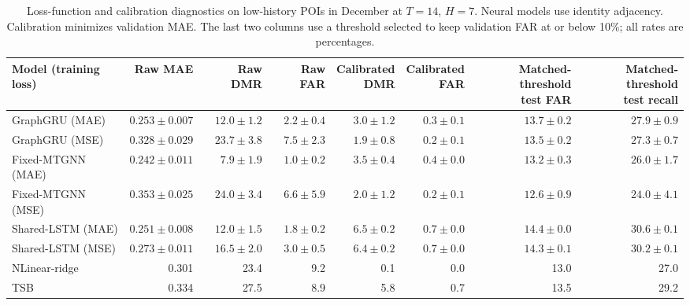 \begin{table}[!htbp]
\centering
\begingroup
\singlespacing
\fontsize{9pt}{10.5pt}\selectfont
\setlength{\tabcolsep}{4pt}
\renewcommand{\arraystretch}{1.08}
\caption{Loss-function and calibration diagnostics on low-history POIs in December at $T=14$, $H=7$. Neural models use identity adjacency. Calibration minimizes validation MAE. The last two columns use a threshold selected to keep validation FAR at or below 10\%; all rates are percentages.}
\label{tab:calibration_loss}
\begin{adjustbox}{max width=\linewidth}
\begin{tabular}{lrrrrrrr}
\toprule
Model (training loss) & Raw MAE & Raw DMR & Raw FAR & \makecell{Calibrated\\DMR} & \makecell{Calibrated\\FAR} & \makecell{Matched-threshold\\test FAR} & \makecell{Matched-threshold\\test recall} \\
\midrule
GraphGRU (MAE) & $0.253\pm 0.007$ & $12.0\pm 1.2$ & $2.2\pm 0.4$ & $3.0\pm 1.2$ & $0.3\pm 0.1$ & $13.7\pm 0.2$ & $27.9\pm 0.9$ \\
GraphGRU (MSE) & $0.328\pm 0.029$ & $23.7\pm 3.8$ & $7.5\pm 2.3$ & $1.9\pm 0.8$ & $0.2\pm 0.1$ & $13.5\pm 0.2$ & $27.3\pm 0.7$ \\
Fixed-MTGNN (MAE) & $0.242\pm 0.011$ & $7.9\pm 1.9$ & $1.0\pm 0.2$ & $3.5\pm 0.4$ & $0.4\pm 0.0$ & $13.2\pm 0.3$ & $26.0\pm 1.7$ \\
Fixed-MTGNN (MSE) & $0.353\pm 0.025$ & $24.0\pm 3.4$ & $6.6\pm 5.9$ & $2.0\pm 1.2$ & $0.2\pm 0.1$ & $12.6\pm 0.9$ & $24.0\pm 4.1$ \\
Shared-LSTM (MAE) & $0.251\pm 0.008$ & $12.0\pm 1.5$ & $1.8\pm 0.2$ & $6.5\pm 0.2$ & $0.7\pm 0.0$ & $14.4\pm 0.0$ & $30.6\pm 0.1$ \\
Shared-LSTM (MSE) & $0.273\pm 0.011$ & $16.5\pm 2.0$ & $3.0\pm 0.5$ & $6.4\pm 0.2$ & $0.7\pm 0.0$ & $14.3\pm 0.1$ & $30.2\pm 0.1$ \\
NLinear-ridge & 0.301 & 23.4 & 9.2 & 0.1 & 0.0 & 13.0 & 27.0 \\
TSB & 0.334 & 27.5 & 8.9 & 5.8 & 0.7 & 13.5 & 29.2 \\
\bottomrule
\end{tabular}
\end{adjustbox}
\endgroup
\end{table}
